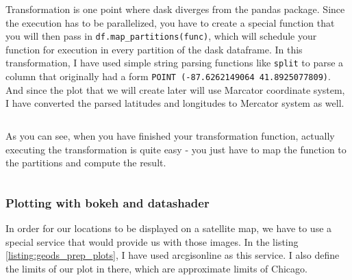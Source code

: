 \documentclass[12pt, a4paper]{article}
\begin{document}
\bgroup
  \inputminted[linenos, breaklines=true, fontsize=\scriptsize, firstnumber=last]{python}{src/geo/ds/1_dataload.py}
  \label{listing:geods_dataload}
\egroup

Transformation is one point where dask diverges from the pandas package. Since the execution has to be parallelized, you have to create a special function that you will then pass in \texttt{df.map\_partitions(func)}, which will schedule your function for execution in every partition of the dask dataframe. In this transformation, I have used simple string parsing functions like \texttt{split} to parse a column that originally had a form \texttt{POINT (-87.6262149064 41.8925077809)}. And since the plot that we will create later will use Marcator coordinate system, I have converted the parsed latitudes and longitudes to Mercator system as well.

\bgroup
  \inputminted[linenos, breaklines=true, fontsize=\scriptsize, firstnumber=last]{python}{src/geo/ds/2a_transform_func.py}
  \label{listing:geods_transform}
\egroup

As you can see, when you have finished your transformation function, actually executing the transformation is quite easy - you just have to map the function to the partitions and compute the result.

\bgroup
  \inputminted[linenos, breaklines=true, fontsize=\scriptsize, firstnumber=last]{python}{src/geo/ds/2b_compute.py}
  \label{listing:geods_compute}
\egroup

\subsubsection{Plotting with bokeh and datashader}

In order for our locations to be displayed on a satellite map, we have to use a special service that would provide us with those images. In the listing \ref{listing:geods_prep_plots}, I have used arcgisonline as this service. I also define the limits of our plot in there, which are approximate limits of Chicago.

\bgroup
  \inputminted[linenos, breaklines=true, fontsize=\scriptsize, firstnumber=last]{python}{src/geo/ds/3a_prep_plots.py}
  \label{listing:geods_prep_plots}
\egroup
\end{document}
